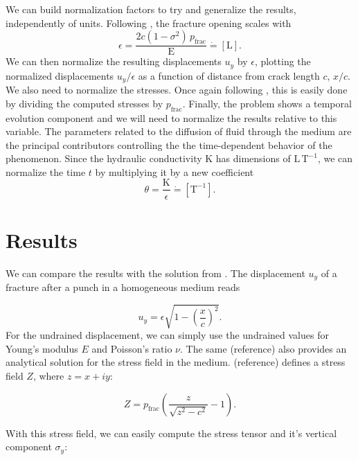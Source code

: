 \documentclass{article}
\begin{document}
We can build normalization factors to try and generalize the results, independently of units. Following , the fracture opening scales with
\begin{equation}
\epsilon = \frac{2c(1 - \sigma^2) \, p_{\text{frac}}}{\mathrm{E}} \dot{=} [\mathrm{L}].
\label{eq:eps}
\end{equation}
We can then normalize the resulting displacements $u_y$ by $\epsilon$, plotting the normalized displacements $u_y/\epsilon$ as a function of distance from crack length $c$, $x/c$. We also need to normalize the stresses. Once again following , this is easily done by dividing the computed stresses by $p_{\text{frac}}$. Finally, the problem shows a temporal evolution component and we will need to normalize the results relative to this variable. The parameters related to the diffusion of fluid through the medium are the principal contributors controlling the the time-dependent behavior of the phenomenon. Since the hydraulic conductivity K has dimensions of $\mathrm{L}\,\mathrm{T}^{-1}$, we can normalize the time $t$ by multiplying it by a new coefficient
\begin{equation}
\theta = \frac{\mathrm{K}}{\epsilon} \dot{=} [\mathrm{T}^{-1}].
\end{equation}
\section{Results}

We can compare the results with the solution from . The displacement $u_y$ of a fracture after a punch in a homogeneous medium reads

\begin{equation}
u_y = \epsilon\sqrt{1 - \left(\frac{x}{c}\right)^2}.
\end{equation}
For the undrained displacement, we can simply use the undrained values for Young's modulus $E$ and Poisson's ratio $\nu$. The same (reference) also provides an analytical solution for the stress field in the medium. (reference) defines a stress field $Z$, where $z=x+iy$:

\begin{equation}
Z = p_{\text{frac}}\left(\frac{z}{\sqrt{z^2 - c^2}} - 1 \right).
\end{equation}

With this stress field, we can easily compute the stress tensor and it's vertical component $\sigma_y$:
\end{document}
